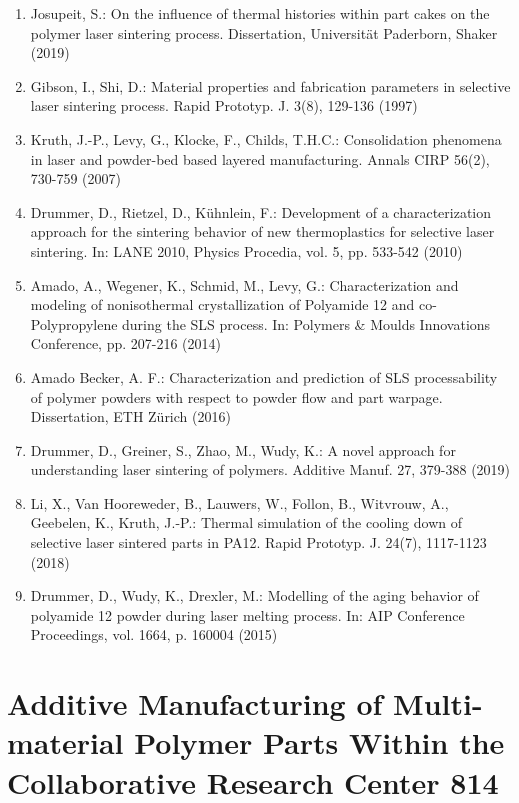 \documentclass[10pt]{article}
\begin{document}
\begin{enumerate}
  \item Josupeit, S.: On the influence of thermal histories within part cakes on the polymer laser sintering process. Dissertation, Universität Paderborn, Shaker (2019)

  \item Gibson, I., Shi, D.: Material properties and fabrication parameters in selective laser sintering process. Rapid Prototyp. J. 3(8), 129-136 (1997)

  \item Kruth, J.-P., Levy, G., Klocke, F., Childs, T.H.C.: Consolidation phenomena in laser and powder-bed based layered manufacturing. Annals CIRP 56(2), 730-759 (2007)

  \item Drummer, D., Rietzel, D., Kühnlein, F.: Development of a characterization approach for the sintering behavior of new thermoplastics for selective laser sintering. In: LANE 2010, Physics Procedia, vol. 5, pp. 533-542 (2010)

  \item Amado, A., Wegener, K., Schmid, M., Levy, G.: Characterization and modeling of nonisothermal crystallization of Polyamide 12 and co-Polypropylene during the SLS process. In: Polymers \& Moulds Innovations Conference, pp. 207-216 (2014)

  \item Amado Becker, A. F.: Characterization and prediction of SLS processability of polymer powders with respect to powder flow and part warpage. Dissertation, ETH Zürich (2016)

  \item Drummer, D., Greiner, S., Zhao, M., Wudy, K.: A novel approach for understanding laser sintering of polymers. Additive Manuf. 27, 379-388 (2019)

  \item Li, X., Van Hooreweder, B., Lauwers, W., Follon, B., Witvrouw, A., Geebelen, K., Kruth, J.-P.: Thermal simulation of the cooling down of selective laser sintered parts in PA12. Rapid Prototyp. J. 24(7), 1117-1123 (2018)

  \item Drummer, D., Wudy, K., Drexler, M.: Modelling of the aging behavior of polyamide 12 powder during laser melting process. In: AIP Conference Proceedings, vol. 1664, p. 160004 (2015)

\end{enumerate}

\section*{Additive Manufacturing of Multi-material Polymer Parts Within the Collaborative Research Center 814 }
\end{document}
